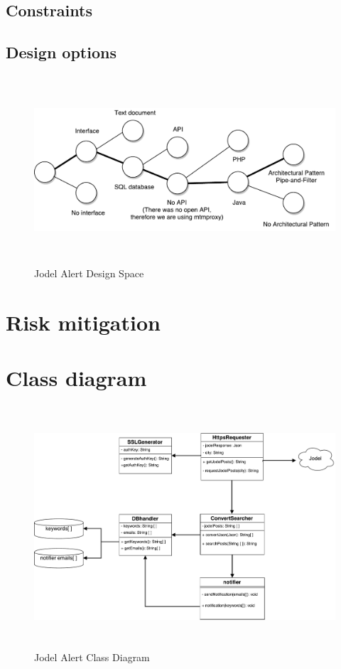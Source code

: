 \documentclass[a4paper,12pt]{article}
\begin{document}
\subsection{Constraints}

\subsection{Design options}
\begin{figure}[!h]
	\centering
	\includegraphics[height=7cm]{img/designspace.pdf}
	\caption{Jodel Alert Design Space}
	\label{Jodel}
\end{figure}

\section{Risk mitigation}
\clearpage
\section{Class diagram}
\begin{figure}[!h]
	\centering
	\includegraphics[height=9cm]{img/jodelUML.pdf}
	\caption{Jodel Alert Class Diagram}
	\label{Jodel}
\end{figure}
\clearpage
\end{document}
